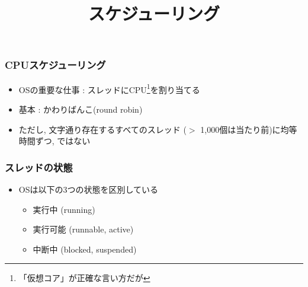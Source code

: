 \documentclass[12pt,dvipdfmx]{beamer}
\title{スケジューリング}
\begin{document}
\maketitle


\begin{frame}
  \frametitle{CPUスケジューリング}
  \begin{itemize}
  \item OSの重要な仕事 : スレッドにCPU\footnote{「仮想コア」が正確な言い方だが}を割り当てる
  \item 基本 : かわりばんこ(round robin)
  \item ただし, 文字通り存在するすべてのスレッド
    ($>$ 1,000個は当たり前)に均等時間ずつ, ではない
  \end{itemize}
\end{frame}

\begin{frame}
  \frametitle{スレッドの状態}
  \begin{itemize}
  \item OSは以下の3つの状態を区別している
    \begin{itemize}
    \item 実行中 (running)
    \item 実行可能 (runnable, active)
    \item 中断中 (blocked, suspended)
    \end{itemize}
  \end{itemize}

  \begin{center}
  \end{center}
\end{frame}
\end{document}
